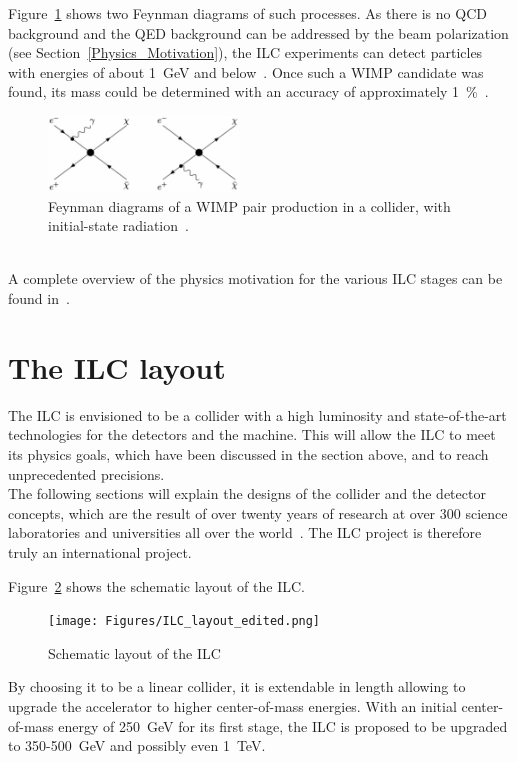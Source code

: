 Figure~\ref{fig:WIMPS} shows two Feynman diagrams of such processes.
As there is no QCD background and the QED background can be addressed by the beam polarization (see Section~\ref{Physics_Motivation}), the ILC experiments can detect particles with energies of about \SI{1}{\GeV} and below~\cite[p. 20]{ILCPhysics}.
Once such a WIMP candidate was found, its mass could be determined with an accuracy of approximately \SI{1}{\percent}~\cite[p. 27]{ILC_Discovery}.
\begin{figure}
\centering
\includegraphics[width=0.45\textwidth]{Figures/WIMP_search.pdf}
\caption[Feynman diagrams of radiative WIMP pair production]{Feynman diagrams of a WIMP pair production in a \positron\electron collider, with initial-state radiation~\cite[p. 4]{WIMP}.}
\label{fig:WIMPS}
\end{figure}
\\A complete overview of the physics motivation for the various ILC stages can be found in~\cite{PhysicsCase}.

\section{The ILC layout}
\label{ILC:layout}
The ILC is envisioned to be a \positron\electron collider with a high luminosity and state-of-the-art technologies for the detectors and the machine.
This will allow the ILC to meet its physics goals, which have been discussed in the section above, and to reach unprecedented precisions.
\\The following sections will explain the designs of the collider and the detector concepts, which are the result of over twenty years of research at over 300 science laboratories and universities all over the world~\cite{TDR1}.
The ILC project is therefore truly an international project.

Figure~\ref{fig:ILC_Layout} shows the schematic layout of the ILC.
\begin{figure}
\centering
\texttt{[image: Figures/ILC\_layout\_edited.png]}
\caption[Schematic layout of the ILC]{Schematic layout of the ILC~\cite[based on p. 9]{TDR1}}
\label{fig:ILC_Layout}
\end{figure}
By choosing it to be a linear collider, it is extendable in length allowing to upgrade the accelerator to higher center-of-mass energies.
With an initial center-of-mass energy of \SI{250}{\GeV} for its first stage, the ILC is proposed to be upgraded to 350-\SI{500}{\GeV} and possibly even \SI{1}{\TeV}.

